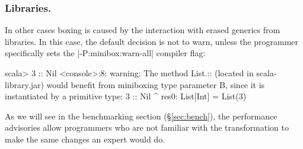\vspace{-0.5em}

\subsubsection{Libraries.} In other cases boxing is caused by the interaction with erased generics from libraries. In this case, the default decision is not to warn, unless the programmer specifically sets the |-P:minibox:warn-all| compiler flag:

\begin{lstlisting-nobreak-nolang}
 scala> 3 :: Nil
 <console>:8: warning: The method List.:: (located in scala-library.jar) would benefit from miniboxing type parameter B, since it is instantiated by a primitive type:
               3 :: Nil
                 ^
 res0: List[Int] = List(3)
\end{lstlisting-nobreak-nolang}

As we will see in the benchmarking section (\S\ref{sec:bench}), the performance advisories allow programmers who are not familiar with the transformation to make the same changes an expert would do.

